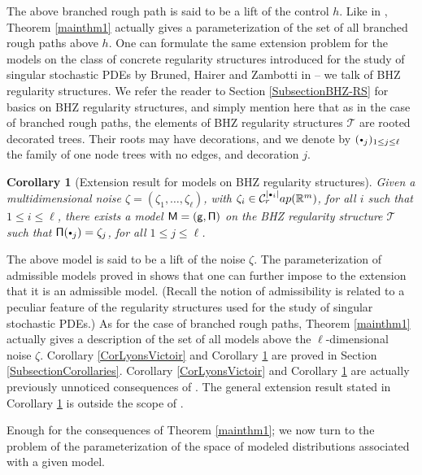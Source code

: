 \documentclass[11pt]{article}
\numberwithin{equation}{section}
\newcommand{\sbullet}{{\scriptscriptstyle\bullet}}
\newcommand{\scbullet}{{\raisebox{1pt}{$\sbullet$}}}
\theoremstyle{plain}
\newtheorem{cor}[thm]{Corollary}
\theoremstyle{definition}
\newcommand{\bbR}{\mathbb{R}}
\newcommand{\mcC}{\mathcal{C}}
\begin{document}
The above branched rough path is said to be a lift of the control $h$. Like in \cite{TZ18}, Theorem \ref{mainthm1} actually gives a parameterization of the set of all branched rough paths above $h$. One can formulate the same extension problem for the models on the class of concrete regularity structures introduced for the study of singular stochastic PDEs by Bruned, Hairer and Zambotti in \cite{BHZ} -- we talk of BHZ regularity structures. We refer the reader to Section \ref{SubsectionBHZ-RS} for basics on BHZ regularity structures, and simply mention here that as in the case of branched rough paths, the elements of BHZ regularity structures $\mathscr{T}$ are rooted decorated trees. Their roots may have decorations, and we denote by $(\scbullet_j)_{1\leq j\leq \ell}$ the family of one node trees with no edges, and decoration $j$.

\begin{cor}[Extension result for models on BHZ regularity structures] \label{CorExtension}
Given a multidimensional noise $\zeta=(\zeta_1,\dots,\zeta_\ell)$, with $\zeta_i\in \mcC^{\vert\sbullet_i\vert}_\textrm{\emph{rap}}(\bbR^m)$, for all $i$ such that $1\leq i\leq\ell$, there exists a model $\sf M=(g,\Pi)$ on the BHZ regularity structure $\mathscr{T}$ such that ${\sf \Pi}(\scbullet_j)=\zeta_j$, for all $1\leq j\leq\ell$.
\end{cor}

The above model is said to be a lift of the noise $\zeta$. The parameterization of admissible models proved in \cite{BH} shows that one can further impose to the extension that it is an admissible model. (Recall the notion of admissibility is related to a peculiar feature of the regularity structures used for the study of singular stochastic PDEs.) As for the case of branched rough paths, Theorem \ref{mainthm1} actually gives a description of the set of all models above the $\ell$-dimensional noise $\zeta$. Corollary \ref{CorLyonsVictoir} and Corollary \ref{CorExtension} are proved in Section \ref{SubsectionCorollaries}. Corollary \ref{CorLyonsVictoir} and Corollary \ref{CorExtension} are actually previously unnoticed consequences of \cite[Th.\,21]{BH}. The general extension result stated in Corollary \ref{CorExtension} is outside the scope of \cite[Th.\,21]{BH}.

Enough for the consequences of Theorem \ref{mainthm1}; we now turn to the problem of the parameterization of the space of modeled distributions associated with a given model.
\end{document}
